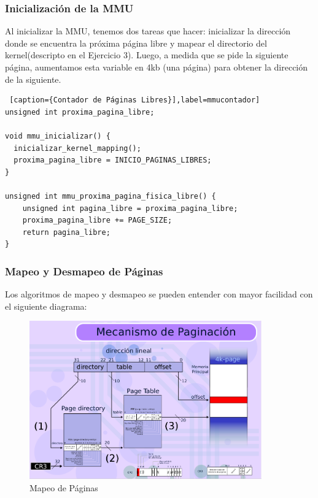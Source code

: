 \subsubsection*{Inicialización de la MMU}

\par Al inicializar la MMU, tenemos dos tareas que hacer: inicializar la direcci\'on donde se encuentra la pr\'oxima p\'agina libre y mapear el directorio del kernel(descripto en el Ejercicio 3). Luego, a medida que se pide la siguiente p\'agina, aumentamos esta variable en 4kb (una p\'agina) para obtener la direcci\'on de la siguiente.

\begin{lstlisting} [caption={Contador de Páginas Libres}],label=mmucontador] 
unsigned int proxima_pagina_libre;

void mmu_inicializar() {
  inicializar_kernel_mapping();
  proxima_pagina_libre = INICIO_PAGINAS_LIBRES;
}

unsigned int mmu_proxima_pagina_fisica_libre() {
    unsigned int pagina_libre = proxima_pagina_libre;
	proxima_pagina_libre += PAGE_SIZE;
	return pagina_libre;
}
\end{lstlisting}

\subsubsection*{Mapeo y Desmapeo de P\'aginas}

\par Los algoritmos de mapeo y desmapeo se pueden entender con mayor facilidad con el siguiente diagrama:

\begin{figure}[ht!]
\centering
\includegraphics[width=100mm]{imagenes/paginacion.png}
\caption{Mapeo de P\'aginas}
\end{figure}

